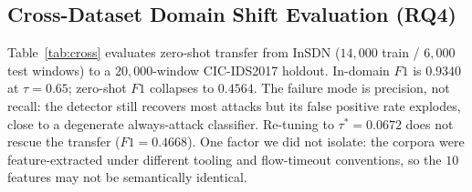 \documentclass[conference,a4paper]{IEEEtran}
\begin{document}
\begin{table}[htbp]
\caption{Effect of the Evaluation Protocol. Identical model, seed, and schedule; only the split and scaler differ.}
\label{tab:leakage}
\begin{center}
\end{center}
\end{table}

\subsection{Cross-Dataset Domain Shift Evaluation (RQ4)}
\label{sec:cross}
Table~\ref{tab:cross} evaluates zero-shot transfer from InSDN ($14{,}000$ train / $6{,}000$ test windows) to a $20{,}000$-window CIC-IDS2017 holdout. In-domain $F1$ is $0.9340$ at $\tau=0.65$; zero-shot $F1$ collapses to $0.4564$. The failure mode is precision, not recall: the detector still recovers most attacks but its false positive rate explodes, close to a degenerate always-attack classifier. Re-tuning to $\tau^*=0.0672$ does not rescue the transfer ($F1 = 0.4668$). One factor we did not isolate: the corpora were feature-extracted under different tooling and flow-timeout conventions, so the $10$ features may not be semantically identical.

\begin{table}[htbp]
\caption{Cross-Dataset Evaluation: Train InSDN $\rightarrow$ Test CIC-IDS2017}
\label{tab:cross}
\begin{center}
\end{center}
\end{table}
\end{document}
